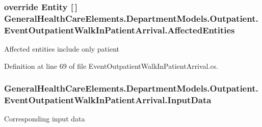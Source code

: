 \subsubsection[{\texorpdfstring{Affected\+Entities}{AffectedEntities}}]{\setlength{\rightskip}{0pt plus 5cm}override {\bf Entity} \mbox{[}$\,$\mbox{]} General\+Health\+Care\+Elements.\+Department\+Models.\+Outpatient.\+Event\+Outpatient\+Walk\+In\+Patient\+Arrival.\+Affected\+Entities\hspace{0.3cm}{\ttfamily [get]}}\hypertarget{class_general_health_care_elements_1_1_department_models_1_1_outpatient_1_1_event_outpatient_walk_in_patient_arrival_a532c73c9853a25576b357add15dc27b5}{}\label{class_general_health_care_elements_1_1_department_models_1_1_outpatient_1_1_event_outpatient_walk_in_patient_arrival_a532c73c9853a25576b357add15dc27b5}


Affected entities include only patient 



Definition at line 69 of file Event\+Outpatient\+Walk\+In\+Patient\+Arrival.\+cs.

\subsubsection[{\texorpdfstring{Input\+Data}{InputData}}]{ General\+Health\+Care\+Elements.\+Department\+Models.\+Outpatient.\+Event\+Outpatient\+Walk\+In\+Patient\+Arrival.\+Input\+Data\hspace{0.3cm}{\ttfamily [get]}}\hypertarget{class_general_health_care_elements_1_1_department_models_1_1_outpatient_1_1_event_outpatient_walk_in_patient_arrival_a1cba937630d5b01979b2907d969c7eb7}{}\label{class_general_health_care_elements_1_1_department_models_1_1_outpatient_1_1_event_outpatient_walk_in_patient_arrival_a1cba937630d5b01979b2907d969c7eb7}


Corresponding input data 



